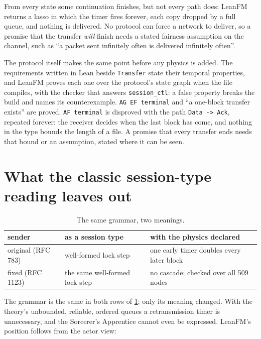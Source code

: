 
From every state some continuation finishes, but not every path does: LeanFM
returns a lasso in which the timer fires forever, each copy dropped by a full
queue, and nothing is delivered. No protocol can force a network to deliver, so a
promise that the transfer \emph{will} finish needs a stated fairness assumption on
the channel, such as ``a packet sent infinitely often is delivered infinitely
often''.

The protocol itself makes the same point before any physics is added. The
requirements written in Lean beside \texttt{Transfer} state their temporal
properties, and LeanFM proves each one over the protocol's state graph when the
file compiles, with the checker that answers \texttt{session\_ctl}: a false
property breaks the build and names its counterexample. \texttt{AG EF terminal}
and ``a one-block transfer exists'' are proved. \texttt{AF terminal} is disproved
with the path \texttt{Data -> Ack}, repeated forever: the receiver decides when the
last block has come, and nothing in the type bounds the length of a file. A promise
that every transfer ends needs that bound or an assumption, stated where it can be
seen.

\section{What the classic session-type reading leaves out}

\begin{table}[ht]
\centering
\small
\begin{tabular}{@{}p{}p{}p{}@{}}
\toprule
sender & as a session type & with the physics declared \\
\midrule
original (RFC 783) & well-formed lock step & one early timer doubles every later block \\
fixed (RFC 1123) & the same well-formed lock step & no cascade; checked over all 509 nodes \\
\bottomrule
\end{tabular}
\caption{The same grammar, two meanings.}
\label{tab:tftp-contrast}
\end{table}

The grammar is the same in both rows of \cref{tab:tftp-contrast}; only its meaning
changed. With the theory's unbounded, reliable, ordered queues
\citep{honda2008multiparty} a retransmission timer is unnecessary, and the
Sorcerer's Apprentice cannot even be expressed. LeanFM's position follows from the
actor view:

